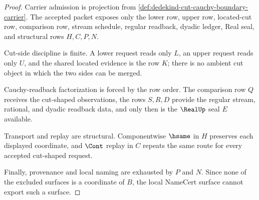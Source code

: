 \begin{proof}
Carrier admission is projection from \autoref{def:dedekind-cut-cauchy-boundary-carrier}. The accepted packet exposes only the lower row, upper row, located-cut row, comparison row, stream schedule, regular readback, dyadic ledger, Real seal, and structural rows $H,C,P,N$.

Cut-side discipline is finite. A lower request reads only $L$, an upper request reads only $U$, and the shared located evidence is the row $K$; there is no ambient cut object in which the two sides can be merged.

Cauchy-readback factorization is forced by the row order. The comparison row $Q$ receives the cut-shaped observations, the rows $S,R,D$ provide the regular stream, rational, and dyadic readback data, and only then is the $\RealUp$ seal $E$ available.

Transport and replay are structural. Componentwise $\hsame$ in $H$ preserves each displayed coordinate, and $\Cont$ replay in $C$ repeats the same route for every accepted cut-shaped request.

Finally, provenance and local naming are exhausted by $P$ and $N$. Since none of the excluded surfaces is a coordinate of $B$, the local NameCert surface cannot export such a surface.
\end{proof}

